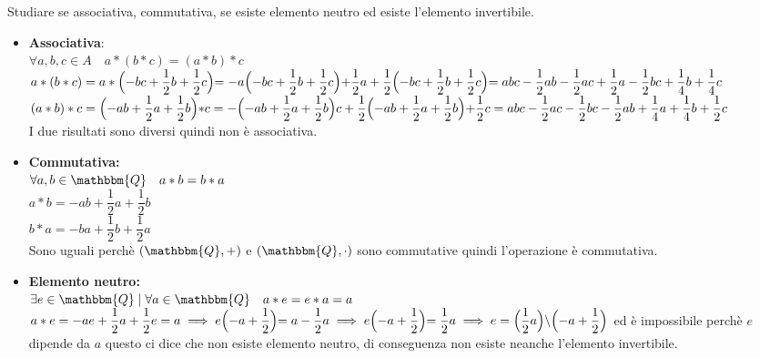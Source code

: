 \documentclass[12pt, letterpaper]{report}
\begin{document}
		Studiare se associativa, commutativa, se esiste elemento neutro ed esiste l'elemento invertibile. \\
		\begin{itemize}
			\item \textbf{Associativa}: \\
			$\forall a,b,c \in A \quad a*(b*c) = (a*b)*c$ \\
			$a*(b*c) = a * \Bigl(-bc +  \dfrac{1}{2}b + \dfrac{1}{2}c\Bigl) = -a\Bigl(-bc + \dfrac{1}{2}b + \dfrac{1}{2}c\Bigl) + \dfrac{1}{2}a + \dfrac{1}{2}\Bigl(-bc + \dfrac{1}{2}b + \dfrac{1}{2}c\Bigl) = abc -\dfrac{1}{2}ab - \dfrac{1}{2}ac + \dfrac{1}{2}a -\dfrac{1}{2}bc + \dfrac{1}{4}b +\dfrac{1}{4}c$ \\
			$(a*b)*c = \Bigl(-ab + \dfrac{1}{2}a + \dfrac{1}{2}b\Bigl) *c = -\Bigl(-ab+\dfrac{1}{2}a+\dfrac{1}{2}b\Bigl)c + \dfrac{1}{2}\Bigl(-ab+\dfrac{1}{2}a + \dfrac{1}{2}b\Bigl) + \dfrac{1}{2}c = abc-\dfrac{1}{2}ac-\dfrac{1}{2}bc -\dfrac{1}{2}ab + \dfrac{1}{4}a + \dfrac{1}{4}b + \dfrac{1}{2}c$ \\
			I due risultati sono diversi quindi non è associativa.
			\item \textbf{Commutativa:} \\
			$\forall a,b \in \mathbbm{Q} \quad a*b=b*a$ \\
			$a*b = -ab + \dfrac{1}{2}a + \dfrac{1}{2}b$ \\
			$b*a=-ba + \dfrac{1}{2}b + \dfrac{1}{2}a$ \\
			Sono uguali perchè $(\mathbbm{Q}, +)$ e $(\mathbbm{Q}, \cdot)$ sono commutative quindi l'operazione è commutativa.
			\item \textbf{Elemento neutro:} \\
			$\exists e \in \mathbbm{Q} \mid \forall a \in \mathbbm{Q} \quad a*e=e*a=a$ \\
			$a*e=-ae+\dfrac{1}{2}a +\dfrac{1}{2}e=a \implies e\Bigl(-a + \dfrac{1}{2}\Bigl) = a - \dfrac{1}{2}a \implies e\Bigl(-a + \dfrac{1}{2}\Bigl) = \dfrac{1}{2}a \implies e = \Bigl(\dfrac{1}{2}a\Bigl)\backslash\Bigl(-a + \dfrac{1}{2}\Bigl)$ ed è impossibile perchè $e$ dipende da $a$ questo ci dice che non esiste elemento neutro, di conseguenza non esiste neanche l'elemento invertibile.
		\end{itemize}
\end{document}
